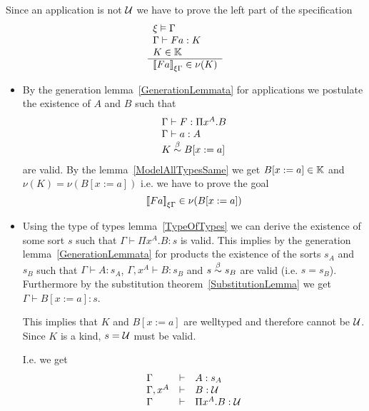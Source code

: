 \begin{definition}
\begin{enumerate}
        Since an application is not ${\cal U}$ we have to prove the left part of the
        specification
        $$
        \begin{array}{l} 
            \xi \vDash \Gamma
            \\
            \Gamma \vdash F a: K
            \\
            K \in \mathbb{K}
         \\ \hline 
            {{[\![}F a{]\!]}}_{\xi\Gamma} \in \nu(K)
        \end{array}
        $$
        \begin{itemize}
        \item
            By the generation lemma~\ref{GenerationLemmata} for applications we
            postulate the existence of $A$ and $B$ such that
            $$
            \begin{array}{l}
                \Gamma \vdash F : \Pi x^A. B
                \\
                \Gamma \vdash a : A
                \\
                K \stackrel{\beta}{\sim} B[x:=a]
            \end{array}
            $$
            are valid. By the lemma~\ref{ModelAllTypesSame} we get $B[x:=a] \in
            \mathbb{K}$ and $\nu(K) = \nu(B[x:=a])$ i.e. we have to prove the goal
            $${{[\![} F a{]\!]}}_{\xi\Gamma} \in \nu(B[x:=a])
            $$

        \item
            Using the type of types lemma~\ref{TypeOfTypes} we can derive the
            existence of some sort $s$ such that $\Gamma \vdash \Pi x^A.B :
            s$ is valid. This implies by the generation
            lemma~\ref{GenerationLemmata} for products the existence of the
            sorts $s_A$ and $s_B$ such that
            $\Gamma \vdash A : s_A$, $\Gamma,x^A \vdash B : s_B$ and $s \stackrel{\beta}{\sim}
            s_B$ are valid (i.e. $s = s_B$). Furthermore by the substitution
            theorem~\ref{SubstitutionLemma} we get $\Gamma \vdash B[x:=a] : s$.

            This implies that $K$ and $B[x:=a]$ are welltyped and therefore
            cannot be ${\cal U}$. Since $K$ is a kind, $s = {\cal U}$ must be valid.

            I.e. we get
            $$
            \begin{array}{lll}
                \Gamma &\vdash& A : s_A
                \\
                \Gamma,x^A &\vdash& B: {\cal U}
                \\
                \Gamma &\vdash& \Pi x^A. B : {\cal U}
            \end{array}
            $$


\end{itemize}
\end{enumerate}
\end{definition}
